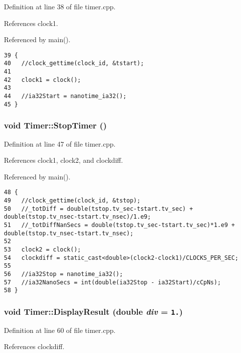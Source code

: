 Definition at line 38 of file timer.cpp.

References clock1.

Referenced by main().

\begin{Code}\begin{verbatim}39 {
40   //clock_gettime(clock_id, &tstart);
41 
42   clock1 = clock();
43   
44   //ia32Start = nanotime_ia32();
45 }
\end{verbatim}
\end{Code}


\subsubsection{\setlength{\rightskip}{0pt plus 5cm}void Timer::StopTimer ()}\label{classTimer_8ebf0e6d027f40f1b419f83f7a1d218a}




Definition at line 47 of file timer.cpp.

References clock1, clock2, and clockdiff.

Referenced by main().

\begin{Code}\begin{verbatim}48 {
49   //clock_gettime(clock_id, &tstop);
50   //_totDiff = double(tstop.tv_sec-tstart.tv_sec) + double(tstop.tv_nsec-tstart.tv_nsec)/1.e9;
51   //_totDiffNanSecs = double(tstop.tv_sec-tstart.tv_sec)*1.e9 + double(tstop.tv_nsec-tstart.tv_nsec);
52 
53   clock2 = clock();
54   clockdiff = static_cast<double>(clock2-clock1)/CLOCKS_PER_SEC;
55   
56   //ia32Stop = nanotime_ia32();  
57   //ia32NanoSecs = int(double(ia32Stop - ia32Start)/cCpNs);
58 }
\end{verbatim}
\end{Code}


\subsubsection{\setlength{\rightskip}{0pt plus 5cm}void Timer::DisplayResult (double {\em div} = {\tt 1.})}\label{classTimer_9791ca9cebd4a28e657d7facecbdb603}




Definition at line 60 of file timer.cpp.

References clockdiff.

